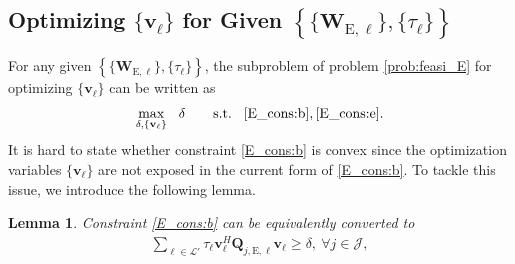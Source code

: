 \documentclass[12pt,draftclsnofoot, onecolumn]{IEEEtran}
\theoremstyle{plain}
\newtheorem{lem}{Lemma}
\begin{document}
\begin{sloppypar}
\subsection{Optimizing $\{\mathbf v_\ell\}$ for Given $\left\lbrace \{\mathbf W_{\mathrm E,\ell}\},\{\tau_\ell\} \right\rbrace$}
For any given $\left\lbrace \{\mathbf W_{\mathrm E,\ell}\},\{\tau_\ell\} \right\rbrace$, the subproblem of problem \eqref{prob:feasi_E} for optimizing $\{\mathbf v_\ell\}$ can be written as 
{\setlength\abovedisplayskip{5pt}
\begin{align}\label{E_sub2}
\underset{\delta,\{\mathbf v_\ell\}}{\max} \hspace{3mm} \delta \hspace{7mm}
\text{s.t.} \hspace{3mm}\eqref{E_cons:b}, \eqref{E_cons:e}.
\end{align}}%
It is hard to state whether constraint \eqref{E_cons:b} is convex since the optimization variables $\{\mathbf v_\ell\}$ are not exposed in the current form of \eqref{E_cons:b}. To tackle this issue, we introduce the following lemma.   
\begin{lem}\label{lem}
	\vspace{-3mm}
	Constraint \eqref{E_cons:b} can be equivalently converted to
	{\setlength\abovedisplayskip{5pt}
	\setlength\belowdisplayskip{5pt}
	\begin{align}\label{E_cons:b_eqv}
	\sum_{\ell\in\mathcal L'}\tau_\ell\mathbf v_{\ell}^H\mathbf Q_{j,\mathrm E, \ell}\mathbf v_{\ell} \geq \delta, \ \forall j\in\mathcal J, 
	\end{align}}%

\end{lem}
\end{sloppypar}
\end{document}
